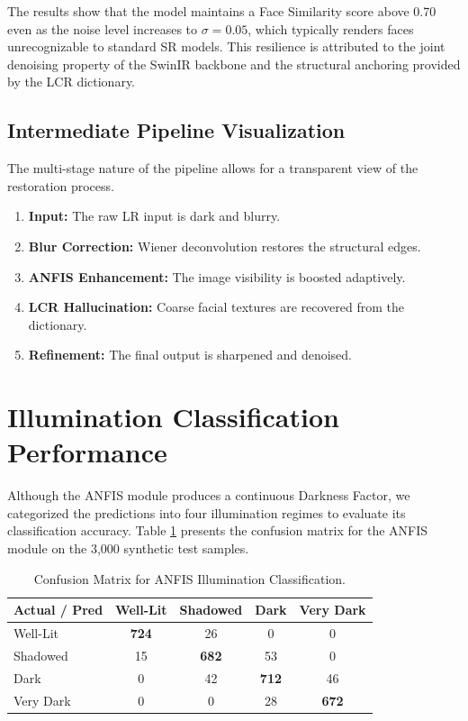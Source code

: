 The results show that the model maintains a Face Similarity score above 0.70 even as the noise level increases to $\sigma=0.05$, which typically renders faces unrecognizable to standard SR models. This resilience is attributed to the joint denoising property of the SwinIR backbone and the structural anchoring provided by the LCR dictionary.

\subsection{Intermediate Pipeline Visualization}
The multi-stage nature of the pipeline allows for a transparent view of the restoration process.
\begin{enumerate}
    \item \textbf{Input:} The raw LR input is dark and blurry.
    \item \textbf{Blur Correction:} Wiener deconvolution restores the structural edges.
    \item \textbf{ANFIS Enhancement:} The image visibility is boosted adaptively.
    \item \textbf{LCR Hallucination:} Coarse facial textures are recovered from the dictionary.
    \item \textbf{Refinement:} The final output is sharpened and denoised.
\end{enumerate}

\section{Illumination Classification Performance}
Although the ANFIS module produces a continuous Darkness Factor, we categorized the predictions into four illumination regimes to evaluate its classification accuracy. Table \ref{tab:confusion} presents the confusion matrix for the ANFIS module on the 3,000 synthetic test samples.

\begin{table}[h]
    \centering
    \caption{Confusion Matrix for ANFIS Illumination Classification.}
    \label{tab:confusion}
    \begin{tabular}{lcccc}
        \toprule
        \textbf{Actual / Pred} & \textbf{Well-Lit} & \textbf{Shadowed} & \textbf{Dark} & \textbf{Very Dark} \\
        \midrule
        Well-Lit & \textbf{724} & 26 & 0 & 0 \\
        Shadowed & 15 & \textbf{682} & 53 & 0 \\
        Dark & 0 & 42 & \textbf{712} & 46 \\
        Very Dark & 0 & 0 & 28 & \textbf{672} \\
        \bottomrule
    \end{tabular}
\end{table}

